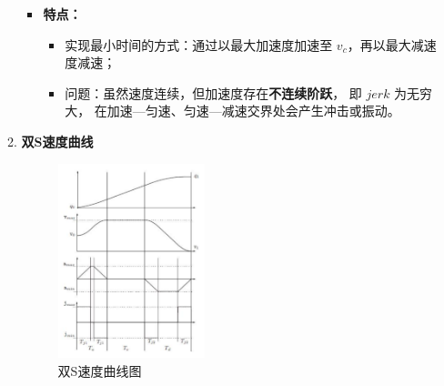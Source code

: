 \documentclass[../main.tex]{subfiles}
\begin{document}
\begin{enumerate}
\begin{enumerate}
{\begin{itemize}
                \vspace{0.5em}
                \item \textbf{特点：}
                \begin{itemize}
                    \item 实现最小时间的方式：通过以最大加速度加速至 $v_c$，再以最大减速度减速；
                    \item 问题：虽然速度连续，但加速度存在\textbf{不连续阶跃}，
                    即 $jerk$ 为无穷大，
                    在加速—匀速、匀速—减速交界处会产生冲击或振动。
                \end{itemize}
            \end{itemize}
            }

            \item \textbf{双S速度曲线}\label{method:doubleS}
                \begin{figure}[H]
                    \centering
                    \includegraphics[width=0.43\textwidth]{images/doubleS.png}
                    \caption{双S速度曲线图}
                \end{figure} 
\end{enumerate}
\end{enumerate}
\end{document}
